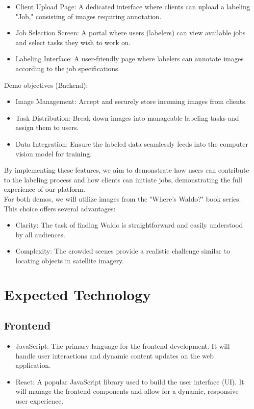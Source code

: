 \documentclass{article}
\begin{document}
\begin{itemize}
    \item Client Upload Page: A dedicated interface where clients can upload a labeling "Job," consisting of images requiring annotation.
    \item Job Selection Screen: A portal where users (labelers) can view available jobs and select tasks they wish to work on.
    \item Labeling Interface: A user-friendly page where labelers can annotate images according to the job specifications.
\end{itemize}

Demo objectives (Backend):

\begin{itemize}
    \item Image Management: Accept and securely store incoming images from clients.
    \item Task Distribution: Break down images into manageable labeling tasks and assign them to users.
    \item Data Integration: Ensure the labeled data seamlessly feeds into the computer vision model for training.
\end{itemize}

By implementing these features, we aim to demonstrate how users can contribute to the labeling process and how clients can initiate jobs, demonstrating the full experience of our platform.\\

For both demos, we will utilize images from the "Where's Waldo?" book series. This choice offers several advantages:

\begin{itemize}
    \item Clarity: The task of finding Waldo is straightforward and easily understood by all audiences.
    \item Complexity: The crowded scenes provide a realistic challenge similar to locating objects in satellite imagery.
\end{itemize}


  \section{Expected Technology}

  \subsection{Frontend}
  \begin{itemize}
      \item JavaScript: The primary language for the frontend development. It will handle user interactions and dynamic content updates on the web application.
  
      \item React: A popular JavaScript library used to build the user interface (UI). It will manage the frontend components and allow for a dynamic, responsive user experience.
  \end{itemize}
  
\end{document}
